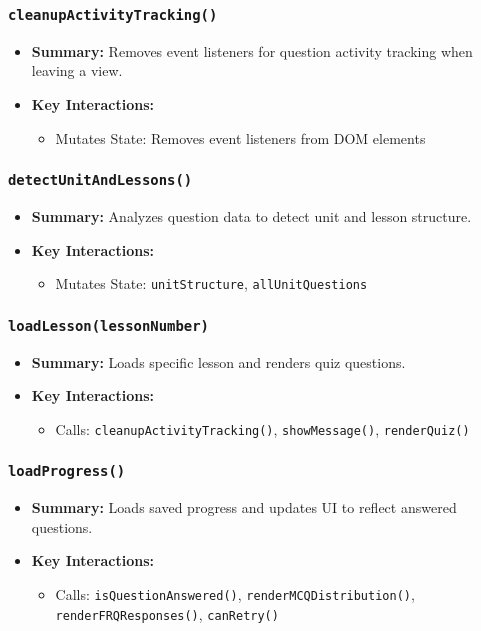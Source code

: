 \documentclass[11pt,letterpaper]{article}
\begin{document}
\subsubsection{\texttt{cleanupActivityTracking()}}
\begin{itemize}
    \item \textbf{Summary:} Removes event listeners for question activity tracking when leaving a view.
    \item \textbf{Key Interactions:}
    \begin{itemize}
        \item Mutates State: Removes event listeners from DOM elements
    \end{itemize}
\end{itemize}

\subsubsection{\texttt{detectUnitAndLessons()}}
\begin{itemize}
    \item \textbf{Summary:} Analyzes question data to detect unit and lesson structure.
    \item \textbf{Key Interactions:}
    \begin{itemize}
        \item Mutates State: \texttt{unitStructure}, \texttt{allUnitQuestions}
    \end{itemize}
\end{itemize}

\subsubsection{\texttt{loadLesson(lessonNumber)}}
\begin{itemize}
    \item \textbf{Summary:} Loads specific lesson and renders quiz questions.
    \item \textbf{Key Interactions:}
    \begin{itemize}
        \item Calls: \texttt{cleanupActivityTracking()}, \texttt{showMessage()}, \texttt{renderQuiz()}
    \end{itemize}
\end{itemize}

\subsubsection{\texttt{loadProgress()}}
\begin{itemize}
    \item \textbf{Summary:} Loads saved progress and updates UI to reflect answered questions.
    \item \textbf{Key Interactions:}
    \begin{itemize}
        \item Calls: \texttt{isQuestionAnswered()}, \texttt{renderMCQDistribution()}, \texttt{renderFRQResponses()}, \texttt{canRetry()}
    \end{itemize}
\end{itemize}
\end{document}
